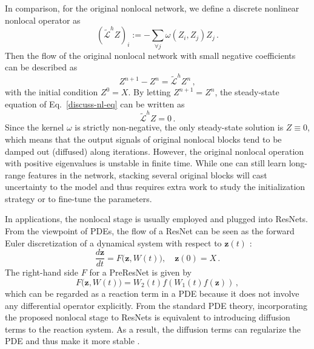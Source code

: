 \documentclass{article}
\newcommand{\xb}{\bm{x}}
\newcommand{\zb}{\bm{z}}
\newcommand{\ub}{\bm{u}}
\begin{document}
In comparison, for the original nonlocal network, we define a discrete nonlinear nonlocal operator as
\begin{equation}\label{nl-op-2}
(\mathcal{\tilde{L}}^h Z)_i:= -\sum_{\forall j} \omega(Z_i,Z_j)Z_j\,.
\end{equation}
Then the flow of the original nonlocal network with small negative coefficients can be described as
\begin{equation}\label{discuss-nl-eq}
Z^{n+1} - Z^n = \mathcal{\tilde{L}}^h Z^n\,,
\end{equation}
with the initial condition $Z^0=X$. By letting $Z^{n+1}=Z^n$, the steady-state equation of Eq.~\eqref{discuss-nl-eq} can be written as
\begin{equation}
\mathcal{\tilde{L}}^hZ = 0\,.
\end{equation}
Since the kernel $\omega$ is strictly non-negative, the only steady-state solution is $Z\equiv 0$, which means that the output signals of original nonlocal blocks tend to be damped out (diffused) along iterations. However, 
 the original nonlocal operation with positive eigenvalues is unstable in finite time. While one can still learn long-range features in the network, stacking several original blocks will cast uncertainty to the model and thus requires extra work to study the initialization strategy or to fine-tune the parameters.

In applications, the nonlocal stage is usually employed and plugged into ResNets. From the viewpoint of PDEs, the flow of a ResNet can be seen as the forward Euler discretization of a dynamical system with respect to $\zb(t)$ \cite{weinan2017proposal}:
\begin{equation}\label{resnet-ds}
\frac{d\zb}{dt} = F\big(\zb, W(t)\big), \quad \zb(0) = X\,.
\end{equation}
The right-hand side $F$ for a PreResNet is given by
\begin{equation}
F\big(\zb,W(t)\big) = W_2(t) f \left (W_1(t) f(\zb) \right)\,,
\end{equation}
which can be regarded as a reaction term in a PDE because it does not involve any differential operator explicitly. From the standard PDE theory, incorporating the proposed nonlocal stage to ResNets is equivalent to introducing diffusion terms to the reaction system. As a result, the diffusion terms can regularize the PDE and thus make it more stable \cite{evans1997partial}.
\end{document}
